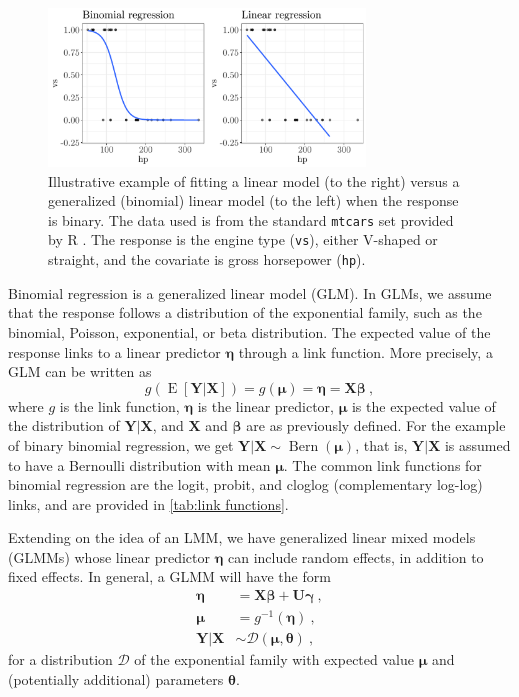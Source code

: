 \begin{figure}
    \centering
    \includegraphics[width=0.75\textwidth]{figures/linear-vs-logistic-example.pdf}
    \caption[Linear versus binomial regression for a binary response.]{Illustrative example of fitting a linear model (to the right) versus a generalized (binomial) linear model (to the left) when the response is binary. The data used is from the standard \texttt{mtcars} set provided by R \autocite{r-core-team}. The response is the engine type (\texttt{vs}), either V-shaped or straight, and the covariate is gross horsepower (\texttt{hp}).}
    \label{fig:illustrative linear-binomial difference}
\end{figure}

Binomial regression is a generalized linear model (GLM). In GLMs, we assume that the response follows a distribution of the exponential family, such as the binomial, Poisson, exponential, or beta distribution. The expected value of the response links to a linear predictor $\bm\eta$ through a link function. More precisely, a GLM can be written as
\begin{equation}
g(\operatorname{E}[\bm Y | \bm X]) = g(\bm \mu) = \bm \eta = \bm X \bm \beta \ ,
\label{eq:glm definition}    
\end{equation}
where $g$ is the link function, $\bm\eta$ is the linear predictor, $\bm\mu$ is the expected value of the distribution of $\bm Y | \bm X$, and $\bm X$ and $\bm\beta$ are as previously defined. For the example of binary binomial regression, we get $\bm Y | \bm X \sim \operatorname{Bern}(\bm\mu)$, that is, $\bm Y | \bm X$ is assumed to have a Bernoulli distribution with mean $\bm\mu$. The common link functions for binomial regression are the logit, probit, and cloglog (complementary log-log) links, and are provided in \autoref{tab:link functions}.

Extending on the idea of an LMM, we have generalized linear mixed models (GLMMs) whose linear predictor $\bm\eta$ can include random effects, in addition to fixed effects. In general, a GLMM will have the form
\begin{align}
    \bm \eta &= \bm X\bm\beta + \bm U \bm \gamma \ , \nonumber \\
    \bm \mu &= g^{-1}(\bm\eta) \ ,  \\
    \bm Y | \bm X &\sim \mathcal D(\bm\mu, \bm\theta) \ , \nonumber
    \label{eq:general glmm}
\end{align}
for a distribution $\mathcal D$ of the exponential family with expected value $\bm\mu$ and (potentially additional) parameters $\bm\theta$.

